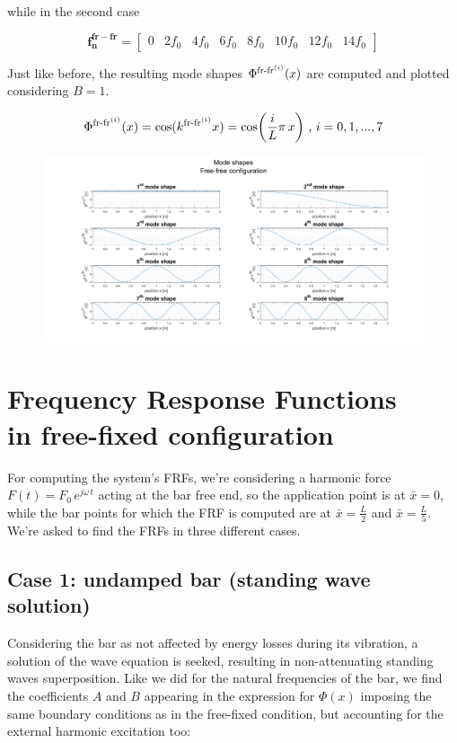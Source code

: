 \documentclass[a4paper,12pt,oneside]{article}
\begin{document}
while in the second case

\[
	\mathbf{f_n^{fr-fr}} =	\begin{bmatrix}
														0	& 2f_0	& 4f_0	& 6f_0	& 8f_0	& 10f_0	& 12f_0	& 14f_0
													\end{bmatrix}
\]

Just like before, the resulting mode shapes $ \Phi^{\textup{fr-fr}^{(i)}}(x) $ are computed and plotted considering $ B = 1 $.

\[
	\Phi^{\textup{fr-fr}^{(i)}}(x) = \cos(k^{\textup{fr-fr}^{(i)}} x) =
		\cos\biggl(\frac{i}{L} \pi \, x\biggr) ~ \text{,} ~ i = 0,1,...,7
\]

\begin{figure}[h]
	\hspace{-70pt}
	\includegraphics[scale=0.4]{mode_shapes_free_free}
\end{figure}


\section{Frequency Response Functions \\ in free-fixed configuration}
\label{sec:frfs}

For computing the system's FRFs, we're considering a harmonic force $ F(t) = F_0 \, e^{j \omega \, t} $ acting at the bar free end, so the application point is at $ \bar{x} = 0 $, while the bar points for which the FRF is computed are at $ \bar{x} = \frac{L}{2} $ and $ \bar{x} = \frac{L}{5} $. We're asked to find the FRFs in three different cases.

\subsection*{Case 1: undamped bar (standing wave solution)}

Considering the bar as not affected by energy losses during its vibration, a solution of the wave equation is seeked, resulting in non-attenuating standing waves superposition. Like we did for the natural frequencies of the bar, we find the coefficients $ A $ and $ B $ appearing in the expression for $ \Phi(x) $ imposing the same boundary conditions as in the free-fixed condition, but accounting for the external harmonic excitation too:
\end{document}
